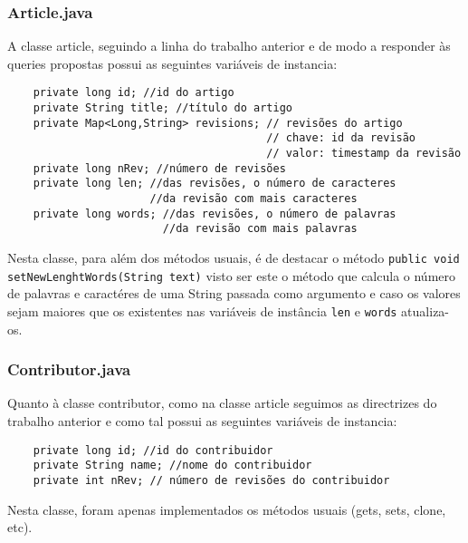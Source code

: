 \documentclass[a4paper,11pt]{article}
\begin{document}
\subsubsection{Article.java}
A classe article, seguindo a linha do trabalho anterior e de modo a responder às queries propostas possui as seguintes variáveis de instancia:
\begin{verbatim}
    private long id; //id do artigo
    private String title; //título do artigo
    private Map<Long,String> revisions; // revisões do artigo
                                        // chave: id da revisão
                                        // valor: timestamp da revisão
    private long nRev; //número de revisões
    private long len; //das revisões, o número de caracteres 
                      //da revisão com mais caracteres 
    private long words; //das revisões, o número de palavras 
                        //da revisão com mais palavras
\end{verbatim}
Nesta classe, para além dos métodos usuais, é de destacar o método \texttt{public void setNewLenghtWords(String text)} visto ser este o  método que calcula o número de palavras e caractéres de uma String passada como argumento e caso os valores sejam maiores que os existentes nas variáveis de instância \texttt{len} e \texttt{words} atualiza-os.

\subsubsection{Contributor.java}
Quanto à classe contributor, como na classe article seguimos as directrizes do trabalho anterior e como tal possui as seguintes variáveis de instancia:
\begin{verbatim}
    private long id; //id do contribuidor
    private String name; //nome do contribuidor
    private int nRev; // número de revisões do contribuidor
\end{verbatim}
Nesta classe, foram apenas implementados os métodos usuais (gets, sets, clone, etc).
\end{document}
